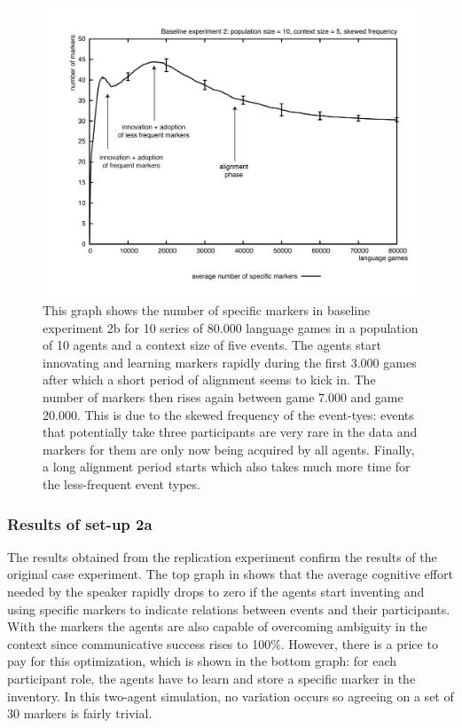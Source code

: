 \begin{figure}[phtb]
\centerline{\includegraphics[width=\textwidth]{Chapter3/figs/graph-base2-size1}}
  \caption[Baseline experiment 2: number of markers (skewed frequency)]{This graph shows the number of specific markers in baseline experiment 2b for 10 series of 80.000 language games in a population of 10 agents and a context size of five events. The agents start innovating and learning markers rapidly during the first 3.000 games after which a short period of alignment seems to kick in. The number of markers then rises again between game 7.000 and game 20.000. This is due to the skewed frequency of the event-tyes: events that potentially take three participants are very rare in the data and markers for them are only now being acquired by all agents. Finally, a long alignment period starts which also takes much more time for the less-frequent event types.}
   \label{f:base2-size1}
\end{figure}
\subsubsection{Results of set-up 2a}
 The results obtained from the replication experiment confirm the results of the original case experiment. The top graph in  shows that the average cognitive effort needed by the speaker rapidly drops to zero if the agents start inventing and using specific markers to indicate relations between events and their participants. With the markers the agents are also capable of overcoming ambiguity in the context since communicative success rises to 100\%. However, there is a price to pay for this optimization, which is shown in the bottom graph: for each participant role, the agents have to learn and store a specific marker in the inventory. In this two-agent simulation, no variation occurs so agreeing on a set of 30 markers is fairly trivial.


